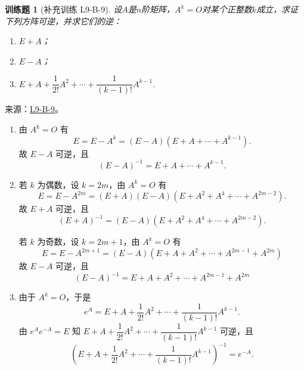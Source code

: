 \documentclass[12pt,fontset=fandol]{ctexart}
\newtheorem{exercise}{训练题}[section]
\begin{document}
\begin{exercise}[补充训练 L9-B-9]\label{prob:L9-B-9}
设$A$是$n$阶矩阵，$A^k=O$对某个正整数$k$成立，求证下列方阵可逆，并求它们的逆：
        \begin{enumerate}
            \item $E+A$；

            \item $E-A$；

            \item $E+A+\dfrac{1}{2!}A^2+\cdots+\dfrac{1}{(k-1)!}A^{k-1}$.
        \end{enumerate}
\end{exercise}
\noindent 来源：\href{https://github.com/yhwu-is/Linear-Algebra-Left-Undone/blob/new/%E8%AE%B2%E4%B9%89/%E4%B8%93%E9%A2%98/9%20%E7%9F%A9%E9%98%B5%E8%BF%90%E7%AE%97%E8%BF%9B%E9%98%B6.tex}{L9-B-9}。
\begin{solve}
\begin{enumerate}
                \item 由 $ A^k = O $ 有
                      \[ E = E - A^k = (E - A)(E + A + \cdots + A^{k - 1}). \]
                      故 $ E - A $ 可逆，且
                      \[ (E - A)^{-1} = E + A + \cdots + A^{k - 1}. \]

                \item 若 $ k $ 为偶数，设 $ k = 2m $，由 $ A^k = O $ 有
                      \[ E = E - A^{2m} = (E + A)(E - A)(E + A^2 + A^4 + \cdots + A^{2m - 2}). \]
                      故 $ E + A $ 可逆，且
                      \[ (E + A)^{-1} = (E - A)(E + A^2 + A^4 + \cdots + A^{2m - 2}). \]

                      若 $ k $ 为奇数，设 $ k = 2m + 1 $，由 $ A^k = O $ 有
                      \[ E = E - A^{2m + 1} = (E - A)(E + A + A^2 + \cdots + A^{2m - 1} + A^{2m}) \]
                      故 $ E - A $ 可逆，且
                      \[ (E - A)^{-1} = E + A + A^2 + \cdots + A^{2m - 1} + A^{2m} \]

                \item 由于 $ A^k = O $，于是
                      \[ e^A = E + A + \frac{1}{2!} A^2 + \cdots + \frac{1}{(k - 1)!} A^{k - 1}. \]
                      由 $ e^A e^{-A} = E $ 知 $ E + A + \dfrac{1}{2!} A^2 + \cdots + \dfrac{1}{(k - 1)!} A^{k - 1} $ 可逆，且
                      \[ (E + A + \frac{1}{2!} A^2 + \cdots + \frac{1}{(k - 1)!} A^{k - 1})^{-1} = e^{-A}. \]
            \end{enumerate}
\end{solve}
\end{document}
